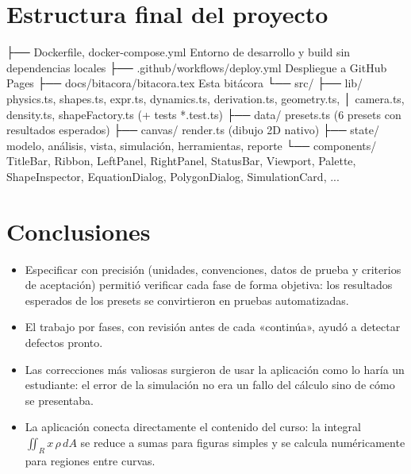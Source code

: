 \documentclass[11pt,a4paper]{article}
\begin{document}
\section{Estructura final del proyecto}
\begin{Prompt}
├── Dockerfile, docker-compose.yml     Entorno de desarrollo y build sin dependencias locales
├── .github/workflows/deploy.yml       Despliegue a GitHub Pages
├── docs/bitacora/bitacora.tex         Esta bitácora
└── src/
    ├── lib/        physics.ts, shapes.ts, expr.ts, dynamics.ts, derivation.ts, geometry.ts,
    │               camera.ts, density.ts, shapeFactory.ts (+ tests *.test.ts)
    ├── data/       presets.ts (6 presets con resultados esperados)
    ├── canvas/     render.ts (dibujo 2D nativo)
    ├── state/      modelo, análisis, vista, simulación, herramientas, reporte
    └── components/ TitleBar, Ribbon, LeftPanel, RightPanel, StatusBar, Viewport, Palette,
                    ShapeInspector, EquationDialog, PolygonDialog, SimulationCard, ...
\end{Prompt}

\section{Conclusiones}

\begin{itemize}
  \item Especificar con precisión (unidades, convenciones, datos de prueba y criterios de aceptación)
        permitió verificar cada fase de forma objetiva: los resultados esperados de los presets se
        convirtieron en pruebas automatizadas.
  \item El trabajo por fases, con revisión antes de cada «continúa», ayudó a detectar defectos pronto.
  \item Las correcciones más valiosas surgieron de usar la aplicación como lo haría un estudiante:
        el error de la simulación no era un fallo del cálculo sino de cómo se presentaba.
  \item La aplicación conecta directamente el contenido del curso: la integral
        $\iint_R x\,\rho\,dA$ se reduce a sumas para figuras simples y se calcula numéricamente para
        regiones entre curvas.
\end{itemize}
\end{document}
